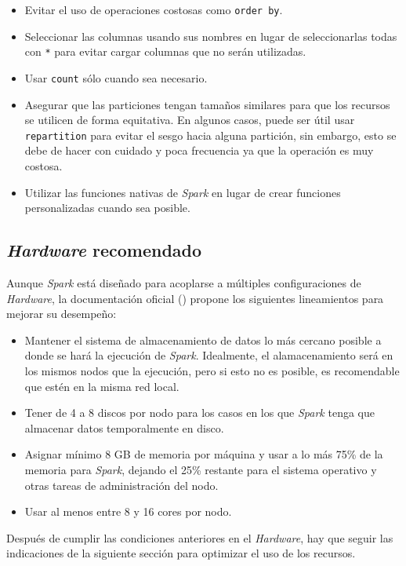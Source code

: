 \begin{itemize}
	\item Evitar el uso de operaciones costosas como \texttt{order by}. 
	\item Seleccionar las columnas usando sus nombres en lugar de seleccionarlas todas con \texttt{*} para evitar cargar columnas que no serán utilizadas.
	\item Usar \texttt{count} sólo cuando sea necesario.
	\item Asegurar que las particiones tengan tamaños similares para que los recursos se utilicen de forma equitativa. En algunos casos, puede ser útil usar \texttt{repartition} para evitar el sesgo hacia alguna partición, sin embargo, esto se debe de hacer con cuidado y poca frecuencia ya que la operación es muy costosa.
	\item Utilizar las funciones nativas de \textit{Spark} en lugar de crear funciones personalizadas cuando sea posible.
\end{itemize}

\subsection{\textit{Hardware} recomendado}

Aunque \textit{Spark} está diseñado para acoplarse a múltiples configuraciones de \textit{Hardware}, la documentación oficial (\cite{sparkhardware}) propone los siguientes lineamientos para mejorar su desempeño:
\begin{itemize}
	\item Mantener el sistema de almacenamiento de datos lo más cercano posible a donde se hará la ejecución de \textit{Spark}. Idealmente, el alamacenamiento será en los mismos nodos que la ejecución, pero si esto no es posible, es recomendable que estén en la misma red local.
	\item Tener de 4 a 8 discos por nodo para los casos en los que \textit{Spark} tenga que almacenar datos temporalmente en disco.
	\item Asignar mínimo 8 GB de memoria por máquina y usar a lo más 75\% de la memoria para \textit{Spark}, dejando el 25\% restante para el sistema operativo y otras tareas de administración del nodo.
	\item Usar al menos entre 8 y 16 cores por nodo. 
\end{itemize}

Después de cumplir las condiciones anteriores en el \textit{Hardware}, hay que seguir las indicaciones de la siguiente sección para optimizar el uso de los recursos.


